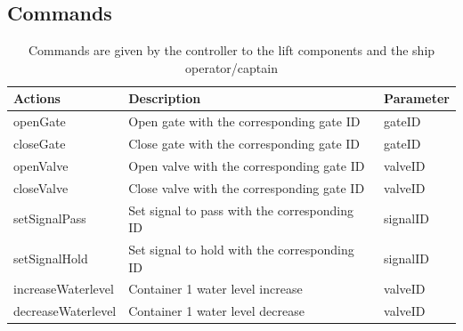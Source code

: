 \subsection{Commands}
\begin{table}[htbp]
	\centering
	\caption{Commands are given by the controller to the lift components and the ship operator/captain}
	\begin{tabular}{lll}
		\toprule
		\textbf{Actions} & \textbf{Description} & \textbf{Parameter} \\
		\midrule
		openGate & Open gate with the corresponding gate ID & gateID \\
		closeGate & Close gate with the corresponding gate ID & gateID \\
		openValve & Open valve with the corresponding gate ID & valveID \\
		closeValve & Close valve with the corresponding gate ID & valveID \\
		setSignalPass & Set signal to pass with the corresponding ID  & signalID \\
		setSignalHold & Set signal to hold with the corresponding ID  & signalID \\
		increaseWaterlevel & Container 1 water level increase & valveID \\
		decreaseWaterlevel & Container 1 water level decrease & valveID \\
		\bottomrule
		\end{tabular}%
		\label{tab:addlabel}%
		\end{table}%
		
		\pagebreak
		
